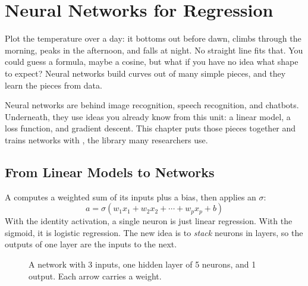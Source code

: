 \chapter{Neural Networks for Regression}

Plot the temperature over a day: it bottoms out before dawn, climbs through the morning, peaks in the afternoon,
and falls at night. No straight line fits that. You could guess a formula, maybe a cosine, but what if you have
no idea what shape to expect? Neural networks build curves out of many simple pieces, and they learn the pieces
from data.

Neural networks are behind image recognition, speech recognition, and chatbots. Underneath, they use ideas you
already know from this unit: a linear model, a loss function, and gradient descent. This chapter puts those
pieces together and trains networks with , the library many researchers use.

\section{From Linear Models to Networks}
A  computes a weighted sum of its inputs plus a bias, then applies an
 $\sigma$:
$$a = \sigma(w_1 x_1 + w_2 x_2 + \cdots + w_p x_p + b)$$
With the identity activation, a single neuron is just linear regression. With the sigmoid, it is logistic
regression. The new idea is to \emph{stack} neurons in layers, so the outputs of one layer are the inputs to the
next.

\begin{figure}[H]
\centering
{}
\caption{A network with 3 inputs, one hidden layer of 5 neurons, and 1 output. Each arrow carries a weight.}
\label{fig:network}
\end{figure}

